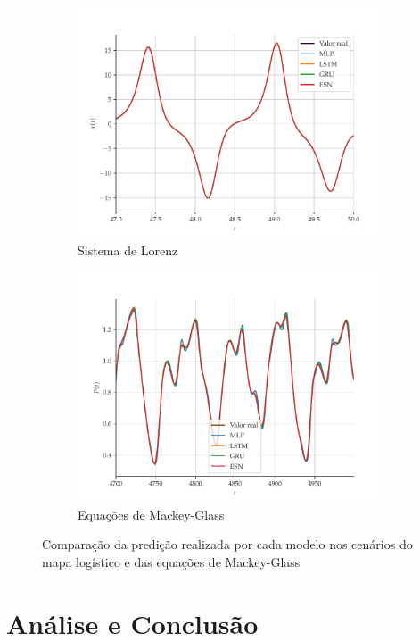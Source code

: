 \documentclass[a4paper, 12pt]{article}
\begin{document}
\begin{figure}[H]
\begin{subfigure}[t]{0.4\textwidth}
         \includegraphics[scale=0.35]{vs-lorenz-zoom.pdf}
         \caption{Sistema de Lorenz}
     \end{subfigure}
     \centering
     \begin{subfigure}[t]{0.4\textwidth}
         \includegraphics[scale=0.35]{vs-mackeyglass-zoom.pdf}
         \caption{Equações de Mackey-Glass}
     \end{subfigure}
     \centering     
     \caption{Comparação da predição realizada por cada modelo nos cenários do mapa logístico e das equações de Mackey-Glass}
     \label{fig:series-comparison}
\end{figure}


\section{Análise e Conclusão}
\end{document}
